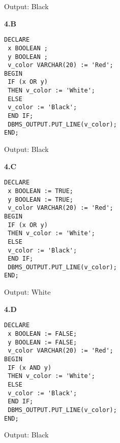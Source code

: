 \documentclass[11pt]{article}
\begin{document}
Output: Black

\textbf{4.B}
\begin{verbatim}
DECLARE
 x BOOLEAN ;
 y BOOLEAN ;
 v_color VARCHAR(20) := 'Red';
BEGIN
 IF (x OR y)
 THEN v_color := 'White';
 ELSE
 v_color := 'Black';
 END IF;
 DBMS_OUTPUT.PUT_LINE(v_color);
END;
\end{verbatim}

Output: Black

\textbf{4.C}
\begin{verbatim}
DECLARE
 x BOOLEAN := TRUE;
 y BOOLEAN := TRUE;
 v_color VARCHAR(20) := 'Red';
BEGIN
 IF (x OR y)
 THEN v_color := 'White';
 ELSE
 v_color := 'Black';
 END IF;
 DBMS_OUTPUT.PUT_LINE(v_color);
END;
\end{verbatim}

Output: White

\textbf{4.D}

\begin{verbatim}
DECLARE
 x BOOLEAN := FALSE;
 y BOOLEAN := FALSE;
 v_color VARCHAR(20) := 'Red';
BEGIN
 IF (x AND y)
 THEN v_color := 'White';
 ELSE
 v_color := 'Black';
 END IF;
 DBMS_OUTPUT.PUT_LINE(v_color);
END;
\end{verbatim}

Output: Black
\end{document}
